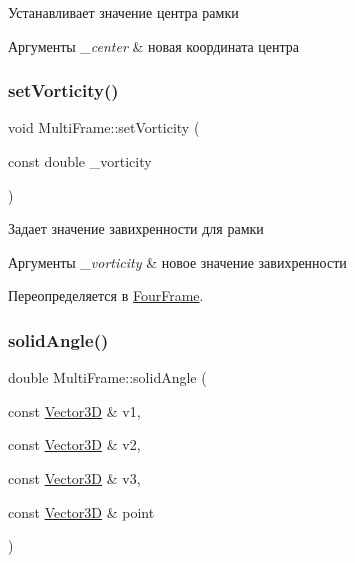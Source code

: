 Устанавливает значение центра рамки 
\begin{DoxyParams}{Аргументы}
{\em \+\_\+center} & новая координата центра \\
\hline
\end{DoxyParams}
\mbox{\label{class_multi_frame_ae06b45f3403f1c6b03d3c6d58aa9f519}} 
\subsubsection{\texorpdfstring{set\+Vorticity()}{setVorticity()}}
{\footnotesize\ttfamily void Multi\+Frame\+::set\+Vorticity (\begin{DoxyParamCaption}\item[{const double}]{\+\_\+vorticity }\end{DoxyParamCaption})\hspace{0.3cm}{\ttfamily [virtual]}}

Задает значение завихренности для рамки 
\begin{DoxyParams}{Аргументы}
{\em \+\_\+vorticity} & новое значение завихренности \\
\hline
\end{DoxyParams}


Переопределяется в \mbox{\hyperlink{class_four_frame_a14e84439f6615d56e5fbc32d438ea2d5}{Four\+Frame}}.

\mbox{\label{class_multi_frame_aa7f6c2151ad01f190edd3757f5ef8162}} 
\subsubsection{\texorpdfstring{solid\+Angle()}{solidAngle()}}
{\footnotesize\ttfamily double Multi\+Frame\+::solid\+Angle (\begin{DoxyParamCaption}\item[{const \mbox{\hyperlink{class_vector3_d}{Vector3D}} \&}]{v1,  }\item[{const \mbox{\hyperlink{class_vector3_d}{Vector3D}} \&}]{v2,  }\item[{const \mbox{\hyperlink{class_vector3_d}{Vector3D}} \&}]{v3,  }\item[{const \mbox{\hyperlink{class_vector3_d}{Vector3D}} \&}]{point }\end{DoxyParamCaption})\hspace{0.3cm}{\ttfamily [static]}}

